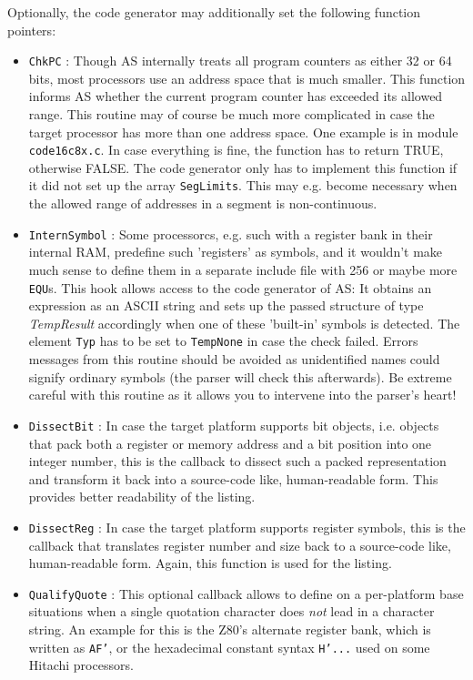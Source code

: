 \documentclass[12pt,twoside]{report}
\newcommand{\tty}[1]{{\tt #1}}
\newcommand{\asname}{{AS}}
\begin{document}
Optionally, the code generator may additionally set the following function
pointers:
\begin{itemize}
\item{\tty{ChkPC} : Though \asname{} internally treats all program counters as
      either 32 or 64 bits, most processors use an address space that is
      much smaller.  This function informs \asname{} whether the current program
      counter has exceeded its allowed range.  This routine may of course
      be much more complicated in case the target processor has more than
      one address space.  One example is in module \tty{code16c8x.c}.  In
      case everything is fine, the function has to return TRUE, otherwise
      FALSE.  The code generator only has to implement this function if
      it did not set up the array {\tt SegLimits}.  This may e.g. become
      necessary when the allowed range of addresses in a segment is
      non-continuous.}
\item{\tty{InternSymbol} : Some processorcs, e.g. such with a register
      bank in their internal RAM, predefine such 'registers' as symbols,
      and it wouldn't make much sense to define them in a separate include
      file with 256 or maybe more {\tt EQU}s.  This hook allows access to
      the code generator of \asname{}: It obtains an expression as an ASCII
      string and sets up the passed structure of type {\em TempResult}
      accordingly when one of these 'built-in' symbols is detected.  The
      element {\tt Typ} has to be set to {\tt TempNone} in case the check
      failed.  Errors messages from this routine should be avoided as
      unidentified names could signify ordinary symbols (the parser will
      check this afterwards).  Be extreme careful with this routine as
      it allows you to intervene into the parser's heart!}
\item{\tty{DissectBit} : In case the target platform supports bit objects,
      i.e. objects that pack both a register or memory address and a bit
      position into one integer number, this is the callback to dissect
      such a packed representation and transform it back into a source-code
      like, human-readable form.  This provides better readability of the
      listing.}
\item{\tty{DissectReg} : In case the target platform supports register
      symbols, this is the callback that translates register number and size
      back to a source-code like, human-readable form.  Again, this function
      is used for the listing.}
\item{\tty{QualifyQuote} : This optional callback allows to define on a
      per-platform base situations when a single quotation character does
      {\em not} lead in a character string.  An example for this is the
      Z80's alternate register bank, which is written as \tty{AF'}, or
      the hexadecimal constant syntax \tty{H'...} used on some Hitachi
      processors.}
\end{itemize}
\end{document}
